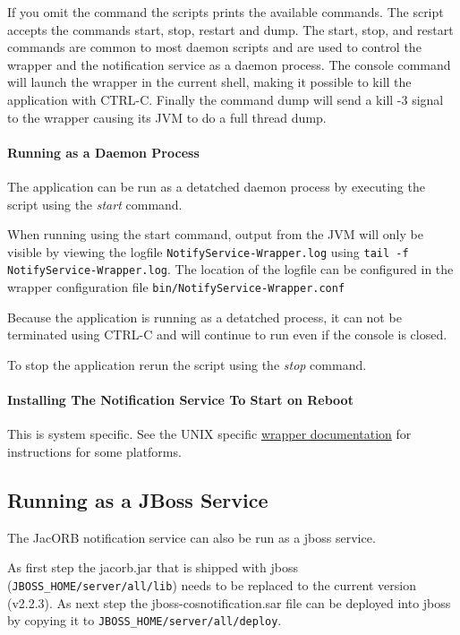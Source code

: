  If you omit the command the scripts prints the available commands.
 The script accepts the commands start, stop, restart and dump. The
 start, stop, and restart commands are common to most daemon scripts
 and are used to control the wrapper and the notification service  as
 a daemon process. The console
 command will launch the wrapper in the current shell, making it
 possible to kill the application with CTRL-C. Finally the command
 dump will send a kill -3 signal to the wrapper causing its JVM
 to do a full thread dump.

 \paragraph{Running as a Daemon Process}
 \label{sec:running-as-daemon}

 The application can be run as a detatched daemon process by executing
 the script using the \emph{start} command.

 When running using the start  command, output from the JVM will only
 be visible by viewing the logfile \texttt{NotifyService-Wrapper.log}
 using \texttt{tail -f NotifyService-Wrapper.log}. The location of the
 logfile can be configured in the wrapper configuration file
 \texttt{bin/NotifyService-Wrapper.conf}

 Because the application is running as a detatched process, it can not
 be terminated using CTRL-C and will continue to run even if the
 console is closed.

 To stop the application rerun the script using the \emph{stop} command.

 \paragraph{Installing The Notification Service To Start on Reboot}
 \label{sec:inst-appl-start}

 This is system specific. See the UNIX specific
 \href{http://wrapper.tanukisoftware.org/doc/english/launch-nix.html}{wrapper
   documentation} for instructions for some platforms.

\subsection{Running as a JBoss Service}

The JacORB notification service can also be run as a jboss service.

As first step the jacorb.jar that is shipped with jboss (\texttt{JBOSS\_HOME/server/all/lib})
needs to be replaced to the current version (v2.2.3).
As next step the jboss-cosnotification.sar file can be deployed into jboss
by copying it to \texttt{JBOSS\_HOME/server/all/deploy}.

